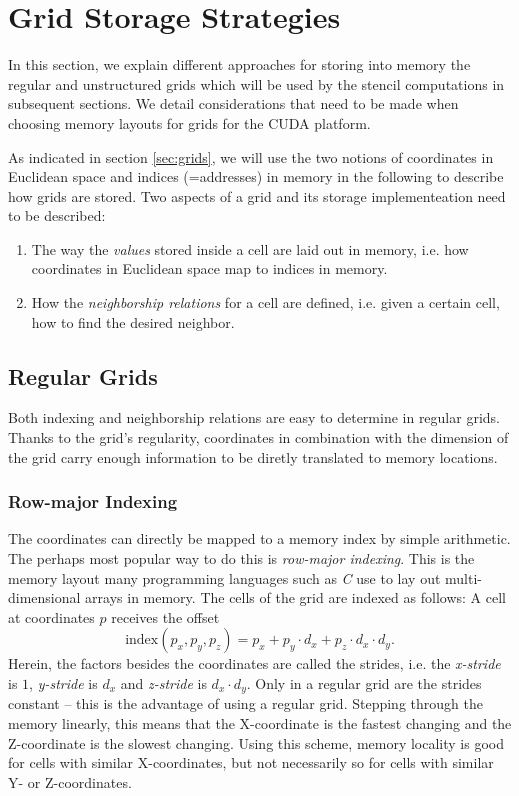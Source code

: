 \chapter{Grid Storage Strategies}				\label{sec:grid-implementations}

In this section, we explain different approaches for storing into memory the regular and unstructured grids which will be used by the stencil computations in subsequent sections. We detail considerations that need to be made when choosing memory layouts for grids for the CUDA platform.

As indicated in section \ref{sec:grids}, we will use the two notions of coordinates in Euclidean space and indices (=addresses) in memory in the following to describe how grids are stored. Two aspects of a grid and its storage implementeation need to be described:
\begin{enumerate}
	\item The way the \emph{values} stored inside a cell are laid out in memory, i.e. how coordinates in Euclidean space map to indices in memory.
	\item How the \emph{neighborship relations} for a cell are defined, i.e. given a certain cell, how to find the desired neighbor.
\end{enumerate}

\section{Regular Grids}

Both indexing and neighborship relations are easy to determine in regular grids. Thanks to the grid's regularity, coordinates in combination with the dimension of the grid carry enough information to be diretly translated to memory locations.

\subsection{Row-major Indexing}

The coordinates can directly be mapped to a memory index by simple arithmetic. The perhaps most popular way to do this is \emph{row-major indexing}. This is the memory layout many programming languages such as \emph{C} use to lay out multi-dimensional arrays in memory. The cells of the grid are indexed as follows: A cell at coordinates $p$ receives the offset
 $$\text{index}\left(p_x, p_y, p_z\right) = p_x + p_y \cdot d_x + p_z \cdot d_x \cdot d_y.$$
Herein, the factors besides the coordinates are called the strides, i.e. the \emph{x-stride} is $1$, \emph{y-stride} is $d_x$ and \emph{z-stride} is $d_x\cdot d_y$. Only in a regular grid are the strides constant -- this is the advantage of using a regular grid. Stepping through the memory linearly, this means that the X-coordinate is the fastest changing and the Z-coordinate is the slowest changing. Using this scheme, memory locality is good for cells with similar X-coordinates, but not necessarily so for cells with similar Y- or Z-coordinates.

